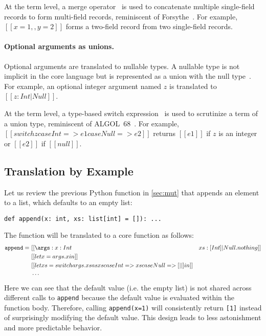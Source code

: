 At the term level, a merge
operator~\citep{dunfield2014elaborating,rehman2023blend} is used to concatenate
multiple single-field records to form multi-field records, reminiscent of
Forsythe~\citep{reynolds1997design}. For example, $[[{x=1},,{y=2}]]$ forms a
two-field record from two single-field records.

\paragraph{Optional arguments as unions.}
Optional arguments are translated to nullable types. A nullable type is not
implicit in the core language but is represented as a union with the null
type~\citep{nieto2020scala}. For example, an optional integer argument named $z$
is translated to $[[{z:Int|Null}]]$.

At the term level, a type-based switch
expression~\citep{frisch2008semantic,rehman2023blend} is used to scrutinize a
term of a union type, reminiscent of ALGOL~68~\citep{van1975revised}. For
example, $[[switch z case Int => e1 case Null => e2]]$ returns $[[e1]]$ if $z$
is an integer or $[[e2]]$ if $[[null]]$.

\subsection{Translation by Example} \label{sec:example}

Let us review the previous Python function in \autoref{sec:mut} that appends an
element to a list, which defaults to an empty list:
\begin{lstlisting}[language={[3]Python}]
def append(x: int, xs: list[int] = []): ...
\end{lstlisting}
The function will be translated to a core function as follows:
\begin{align*}
\mathtt{append} =~& [[ \args: {x:Int}&{xs:[Int]|Null}. nothing]] \\
                  & [[ let x = args.x in ]] \\
                  & [[ let xs = switch args.xs as xs case Int => xs case Null => [||] in ]] \\
                  & \cdots
\end{align*}
Here we can see that the default value (i.e. the empty list) is not shared
across different calls to \lstinline{append} because the default value is
evaluated within the function body. Therefore, calling \lstinline{append(x=1)}
will consistently return \lstinline{[1]} instead of surprisingly modifying the
default value. This design leads to less astonishment and more predictable
behavior.

